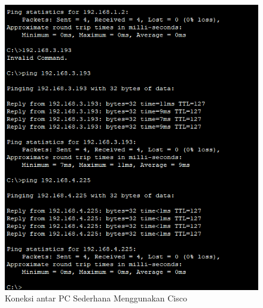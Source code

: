 \begin{enumerate}
\begin{figure}[h]
    \begin{center}
        \includegraphics[scale=0.36]{P1/img/datatupen1.png}
        \caption{Koneksi antar PC Sederhana Menggunakan Cisco}
        \label{fig:tupenp1}
    \end{center}
\end{figure}


\end{enumerate}
